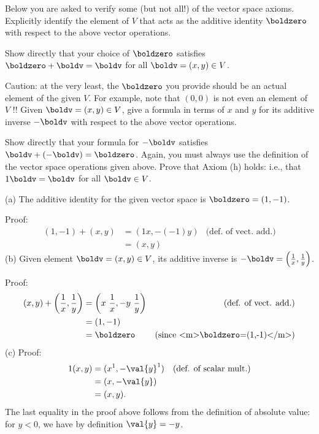 Below you are asked to verify some (but not all!) of the vector space axioms.   
\bb
\ii Explicitly identify the element of $V$ that acts as the additive identity $\boldzero$ with respect to the above vector operations. 

Show directly that your choice of $\boldzero$ satisfies $\boldzero+\boldv=\boldv$ for all $\boldv=(x,y)\in V$. 

Caution: at the very least, the $\boldzero$ you provide should be an actual element of the given $V$. For example, note that $(0,0)$ is not even an element of $V$ !!
\ii Given $\boldv=(x,y)\in V$, give a formula in terms of $x$ and $y$ for its additive inverse $-\boldv$ with respect to the above vector operations.

Show directly that your formula for $-\boldv$ satisfies $\boldv+ (-\boldv)=\boldzero$. Again, you must always use the definition of the vector space operations given above.
\ii Prove that Axiom (h) holds: i.e., that $1\boldv=\boldv$ for all $\boldv\in V$.  
\ee
\begin{solution}
\noindent
(a) The additive identity for the given vector space is $\boldzero=(1,-1)$. 

\noindent
Proof:
\begin{align*}
(1,-1)+(x,y)&=(1x,-(-1)y) &\text{(def. of vect. add.)}\\
&=(x,y)
\end{align*}
(b) Given element $\boldv=(x,y)\in V$, its additive inverse is $-\boldv=\left(\frac{1}{x},\frac{1}{y}\right)$. 

\noindent
Proof:
\begin{align*}
(x,y)+\left(\frac{1}{x},\frac{1}{y}\right)&=\left(x\ \frac{1}{x},-y\ \frac{1}{y}\right) &\text{(def. of vect. add.)}\\
&=(1,-1)\\
&=\boldzero &\text{(since <m>\boldzero=(1,-1)</m>)}
\end{align*}
(c) Proof:
\begin{align*}
1(x,y)&=(x^1,-\val{y}^1) &\text{(def. of scalar mult.)}\\
&=(x,-\val{y})\\
&=(x,y). 
\end{align*}
The last equality in the proof above follows from the definition of absolute value: for $y<0$, we have by definition $\val{y}=-y$. 
\end{solution}

